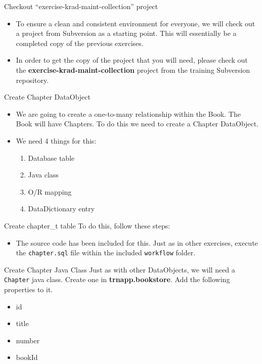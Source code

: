 \documentclass[xcolor=dvipsnames,14pt,professionalfonts]{beamer}
\begin{document}
\begin{frame}{Checkout “exercise-krad-maint-collection” project}
  \begin{itemize}
    \item To ensure a clean and consistent environment for everyone, we will check out a project from Subversion as a starting point.  This will essentially be a completed copy of the previous exercises.
    \item In order to get the copy of the project that you will need,
      please check out the \textbf{exercise-krad-maint-collection} project from
      the training Subversion repository.
      \end{itemize}
    \end{frame}
    
    \begin{frame}{Create Chapter DataObject}
      \begin{itemize}
      \item We are going to create a one-to-many relationship within
        the Book. The Book will have Chapters. To do this we need to
        create a Chapter DataObject.
      \item We need 4 things for this:
        \begin{enumerate}
          \item Database table
          \item Java class
          \item O/R mapping
          \item DataDictionary entry
          \end{enumerate}
      \end{itemize}     
    \end{frame}

    \begin{frame}{Create chapter\_t table}
 To do this, follow these steps:
      \begin{itemize}
      \item The source code has been included for this. Just as in
        other exercises, execute the \texttt{chapter.sql} file within
        the included \texttt{workflow} folder.
      \end{itemize}     
    \end{frame}
 
 \begin{frame}{Create Chapter Java Class}
   Just as with other DataObjects, we will need a \texttt{Chapter}
   java class. Create one in \textbf{trnapp.bookstore}. Add the
   following properties to it.
   \begin{itemize}
     \item id
     \item title
     \item number
     \item bookId
   \end{itemize}
 \end{frame}
\end{document}

